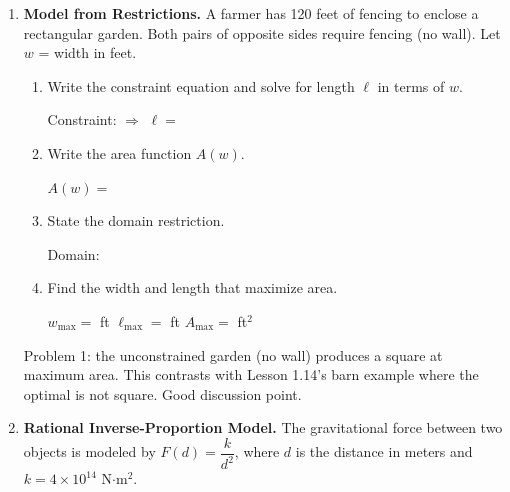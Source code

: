 \documentclass[10pt]{article}
\begin{document}
\namedateperiod

\vspace{0.1in}

\begin{enumerate}[itemsep=18pt]

\item \textbf{Model from Restrictions.} A farmer has 120 feet of fencing to enclose a
      rectangular garden. Both pairs of opposite sides require fencing (no wall).
      Let $w$ = width in feet.

      \begin{enumerate}[label=(\alph*), itemsep=8pt]
        \item Write the constraint equation and solve for length $\ell$ in terms of $w$.

              \vspace{0.06in}
              Constraint:  \quad $\Rightarrow$ \quad $\ell = $ 

        \item Write the area function $A(w)$.

              \vspace{0.06in}
              $A(w) = $ 

        \item State the domain restriction.

              \vspace{0.06in}
              Domain: 

        \item Find the width and length that maximize area.

              \vspace{0.06in}
              $w_{\max} = $  ft \quad $\ell_{\max} = $  ft \quad $A_{\max} = $  ft$^2$
      \end{enumerate}

\begin{teachernote}
Problem 1: the unconstrained garden (no wall) produces a square at maximum area. This contrasts with Lesson 1.14's barn example where the optimal is not square. Good discussion point.
\end{teachernote}

\item \textbf{Rational Inverse-Proportion Model.} The gravitational force between two objects
      is modeled by $F(d) = \dfrac{k}{d^2}$, where $d$ is the distance in meters and $k = 4\times10^{14}$
      N$\cdot$m$^2$.


\end{enumerate}
\end{document}

